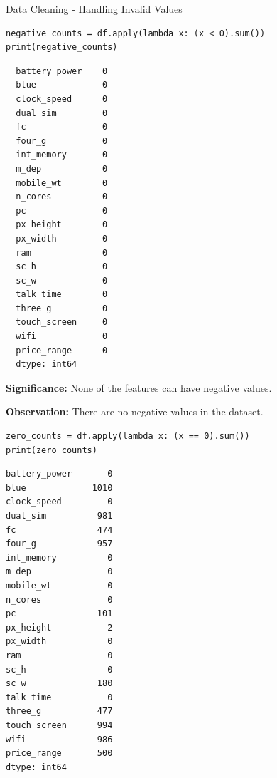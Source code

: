 \documentclass[14pt, aspectratio=169]{beamer}
\begin{document}
\begin{frame}{Data Cleaning - Handling Invalid Values}
  \begin{verbatim}
negative_counts = df.apply(lambda x: (x < 0).sum())
print(negative_counts)
  \end{verbatim}
  \begin{minipage}{0.2\textwidth}
    
  \tiny
  \vspace{0.3em}
  \begin{verbatim}
  battery_power    0
  blue             0
  clock_speed      0
  dual_sim         0
  fc               0
  four_g           0
  int_memory       0
  m_dep            0
  mobile_wt        0
  n_cores          0
  pc               0
  px_height        0
  px_width         0
  ram              0
  sc_h             0
  sc_w             0
  talk_time        0
  three_g          0
  touch_screen     0
  wifi             0
  price_range      0
  dtype: int64

  \end{verbatim}
  \normalsize
\end{minipage}
\hfill
\begin{minipage}{0.6\textwidth}
  \begin{block}{}
    \textbf{Significance:} \small
    None of the features can have negative values.
  \end{block}
  \begin{block}{}
    \textbf{Observation:} \small
    There are no negative values in the dataset.
  \end{block}
  
\end{minipage}

  \begin{verbatim}
zero_counts = df.apply(lambda x: (x == 0).sum())
print(zero_counts)
  \end{verbatim}
  \begin{minipage}{0.2\textwidth}
    
  \tiny
  \vspace{0.3em}
  \begin{verbatim}
battery_power       0
blue             1010
clock_speed         0
dual_sim          981
fc                474
four_g            957
int_memory          0
m_dep               0
mobile_wt           0
n_cores             0
pc                101
px_height           2
px_width            0
ram                 0
sc_h                0
sc_w              180
talk_time           0
three_g           477
touch_screen      994
wifi              986
price_range       500
dtype: int64


\end{verbatim}
\end{minipage}
\end{frame}
\end{document}
